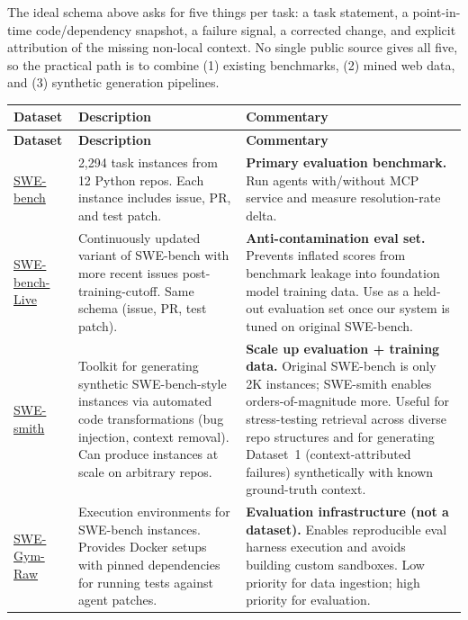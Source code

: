 \documentclass[a4paper,12pt]{article}
\begin{document}
The ideal schema above asks for five things per task: a task statement, a point-in-time code/dependency snapshot, a failure signal, a corrected change, and explicit attribution of the missing non-local context. No single public source gives all five, so the practical path is to combine (1) existing benchmarks, (2) mined web data, and (3) synthetic generation pipelines.

\footnotesize
\begin{longtable}{@{} p{3cm} p{5cm} p{7cm} @{}}

\toprule
\textbf{Dataset} & \textbf{Description} & \textbf{Commentary} \\
\midrule
\endfirsthead

\toprule
\textbf{Dataset} & \textbf{Description} & \textbf{Commentary} \\
\midrule
\endhead

\bottomrule
\endfoot

\href{https://www.swebench.com/original.html}{SWE-bench} &
2,294 task instances from 12 Python repos. Each instance includes issue, PR, and test patch. &
\textbf{Primary evaluation benchmark.} Run agents with/without MCP service and measure resolution-rate delta. \\

\href{https://huggingface.co/datasets/SWE-bench-Live/SWE-bench-Live}{SWE-bench-Live} &
Continuously updated variant of SWE-bench with more recent issues post-training-cutoff. Same schema (issue, PR, test patch). &
\textbf{Anti-contamination eval set.} Prevents inflated scores from benchmark leakage into foundation model training data. Use as a held-out evaluation set once our system is tuned on original SWE-bench. \\

\href{https://github.com/SWE-bench/SWE-smith}{SWE-smith} &
Toolkit for generating synthetic SWE-bench-style instances via automated code transformations (bug injection, context removal). Can produce instances at scale on arbitrary repos. &
\textbf{Scale up evaluation + training data.} Original SWE-bench is only 2K instances; SWE-smith enables orders-of-magnitude more. Useful for stress-testing retrieval across diverse repo structures and for generating Dataset~1 (context-attributed failures) synthetically with known ground-truth context. \\

\href{https://huggingface.co/datasets/SWE-Gym/SWE-Gym-Raw}{SWE-Gym-Raw} &
Execution environments for SWE-bench instances. Provides Docker setups with pinned dependencies for running tests against agent patches. &
\textbf{Evaluation infrastructure (not a dataset).} Enables reproducible eval harness execution and avoids building custom sandboxes. Low priority for data ingestion; high priority for evaluation. \\


\end{longtable}
\end{document}

